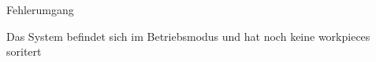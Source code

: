 \begin{abntest}{Fehlerumgang}{

}{
    \item Das System befindet sich im Betriebsmodus und hat noch keine \glspl{workpiece} soritert
}
    \label{abntest-fehlerumgang}


\end{abntest}
